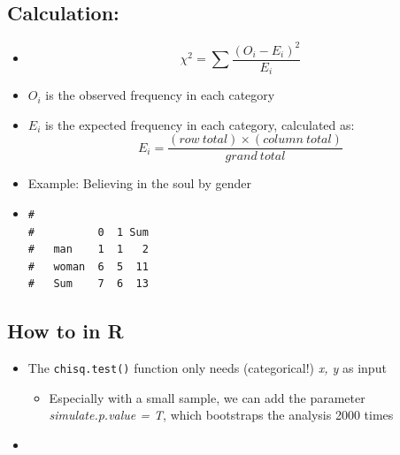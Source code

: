 \documentclass[
]{book}
\newenvironment{Shaded}{\begin{snugshade}}{\end{snugshade}}
\newcommand{\AttributeTok}[1]{\textcolor[rgb]{0.13,0.29,0.53}{#1}}
\newcommand{\CommentTok}[1]{\textcolor[rgb]{0.56,0.35,0.01}{\textit{#1}}}
\newcommand{\FunctionTok}[1]{\textcolor[rgb]{0.13,0.29,0.53}{\textbf{#1}}}
\newcommand{\NormalTok}[1]{#1}
\newcommand{\SpecialCharTok}[1]{\textcolor[rgb]{0.81,0.36,0.00}{\textbf{#1}}}
\providecommand{\tightlist}{%
  \setlength{\itemsep}{0pt}\setlength{\parskip}{0pt}}
\begin{document}
\subsection{Calculation:}\label{calculation}

\begin{itemize}
\item
  \[\chi^2 = \sum \frac{(O_i - E_i)^2}{E_i}\]
\item
  \(O_i\) is the observed frequency in each category
\item
  \(E_i\) is the expected frequency in each category, calculated as: \[E_i = \frac{(row \ total) \times (column \ total)}{grand \ total}\]
\item
  Example: Believing in the soul by gender
\item
\begin{verbatim}
#        
#          0  1 Sum
#   man    1  1   2
#   woman  6  5  11
#   Sum    7  6  13
\end{verbatim}
\end{itemize}

\subsection{How to in R}\label{how-to-in-r}

\begin{itemize}
\item
  The \texttt{chisq.test()} function only needs (categorical!) \emph{x, y} as input

  \begin{itemize}
  \tightlist
  \item
    Especially with a small sample, we can add the parameter \emph{simulate.p.value = T}, which bootstraps the analysis 2000 times
  \end{itemize}
\item
\begin{Shaded}
\end{Shaded}
\end{itemize}
\end{document}
